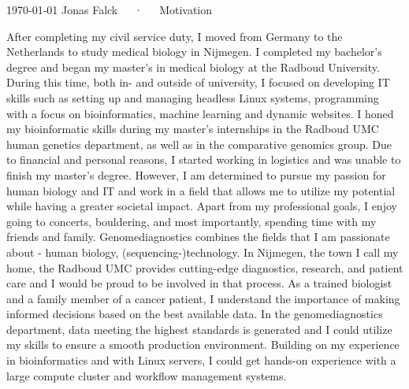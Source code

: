 \documentclass[11pt, a4paper]{awesome-cv}
\begin{document}
\makecvheader[R]

\makecvfooter
  {\today}
  {Jonas Falck~~~·~~~Motivation}
  {}

\makelettertitle

\begin{cvletter}

After completing my civil service duty, I moved from Germany to the Netherlands to study medical biology in Nijmegen. 
I completed my bachelor’s degree and began my master's in medical biology at the Radboud University. 
During this time, both in- and outside of university, I focused on developing IT skills such as setting up and managing headless Linux systems, programming with a focus on bioinformatics, machine learning and dynamic websites. 
I honed my bioinformatic skills during my master's internships in the Radboud UMC human genetics department, as well as in the comparative genomics group. 
Due to financial and personal reasons, I started working in logistics and was unable to finish my master’s degree. 
However, I am determined to pursue my passion for human biology and IT and work in a field that allows me to utilize my potential while having a greater societal impact.
Apart from my professional goals, I enjoy going to concerts, bouldering, and most importantly, spending time with my friends and family.
Genomediagnostics combines the fields that I am passionate about - human biology, (sequencing-)technology. 
In Nijmegen, the town I call my home, the Radboud UMC provides cutting-edge diagnostics, research, and patient care and I would be proud to be involved in that process. 
As a trained biologist and a family member of a cancer patient, I understand the importance of making informed decisions based on the best available data.
In the genomediagnostics department, data meeting the highest standards is generated and I could utilize my skills to ensure a smooth production environment.
Building on my experience in bioinformatics and with Linux servers, I could get hands-on experience with a large compute cluster and workflow management systems.

\end{cvletter}
\end{document}
